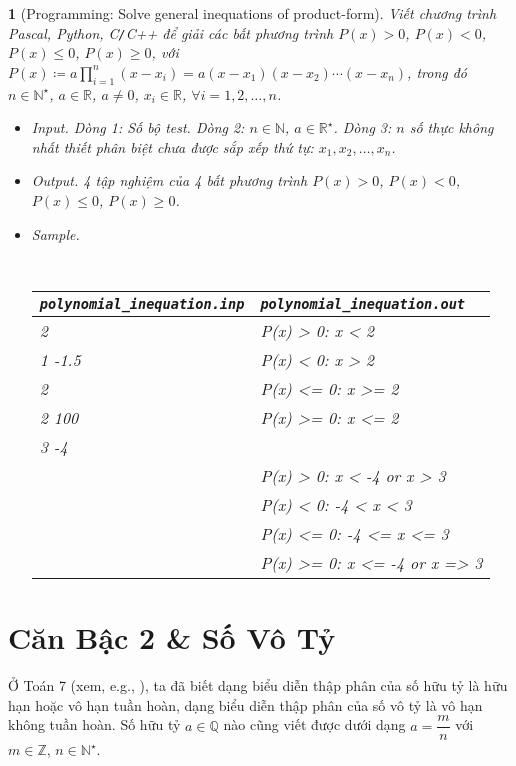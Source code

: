 \documentclass{article}
\newtheorem{baitoan}{}%
\begin{document}
\begin{baitoan}[Programming: Solve general inequations of product-form]
	Viết chương trình {\sf Pascal, Python, C{\tt/}C++} để giải các bất phương trình $P(x) > 0$, $P(x) < 0$, $P(x)\le0$, $P(x)\ge0$, với $P(x)\coloneqq a\prod_{i=1}^n (x - x_i) = a(x - x_1)(x - x_2)\cdots(x - x_n)$, trong đó $n\in\mathbb{N}^\star$, $a\in\mathbb{R}$, $a\ne0$, $x_i\in\mathbb{R}$, $\forall i = 1,2,\ldots,n$.
	\begin{itemize}
		\item {\sf Input.} Dòng 1: Số bộ test. Dòng 2: $n\in\mathbb{N}$, $a\in\mathbb{R}^\star$. Dòng 3: $n$ số thực không nhất thiết phân biệt chưa được sắp xếp thứ tự: $x_1,x_2,\ldots,x_n$. 
		\item {\sf Output.} 4 tập nghiệm của 4 bất phương trình $P(x) > 0$, $P(x) < 0$, $P(x)\le0$, $P(x)\ge0$.
		\item {\sf Sample.}
		\begin{table}[H]
			\centering\tt
			\begin{tabular}{|l|l|}
				\hline
				\verb|polynomial_inequation.inp| & \verb|polynomial_inequation.out| \\
				\hline
				2 & P(x) > 0: x < 2 \\
				1 -1.5 & P(x) < 0: x > 2 \\
				2 & P(x) <= 0: x >= 2 \\
				2 100 & P(x) >= 0: x <= 2 \\
				3 -4 & \\
				& P(x) > 0: x < -4 or x > 3 \\
				& P(x) < 0: -4 < x < 3 \\
				& P(x) <= 0: -4 <= x <= 3 \\
				& P(x) >= 0: x <= -4 or x => 3 \\
				\hline
			\end{tabular}
		\end{table}
	\end{itemize}
\end{baitoan}


\section{Căn Bậc 2 \& Số Vô Tỷ}
Ở Toán 7 (xem, e.g., \cite[\S5, pp. 27--29]{SGK_Toan_7_Canh_Dieu_tap_1}), ta đã biết dạng biểu diễn thập phân của số hữu tỷ là hữu hạn hoặc vô hạn tuần hoàn, dạng biểu diễn thập phân của số vô tỷ là vô hạn không tuần hoàn. Số hữu tỷ $a\in\mathbb{Q}$ nào cũng viết được dưới dạng $a = \dfrac{m}{n}$ với $m\in\mathbb{Z}$, $n\in\mathbb{N}^\star$.
\end{document}
